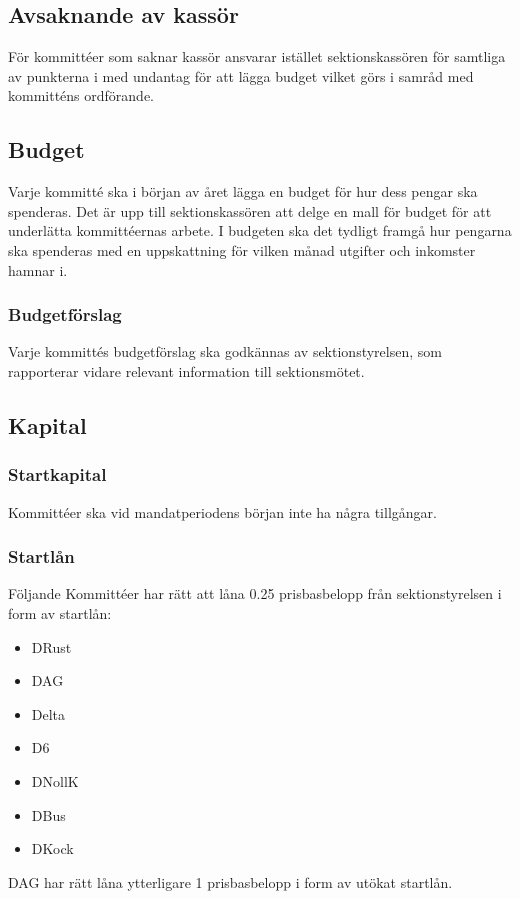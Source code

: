 \documentclass[a4paper]{dtek}
\newcommand{\prisbasbelopp}[1]{
    #1 prisbasbelopp
    \ifdef{\nuvarandeprisbasbelopp}{
        \marginpar{
            \small{ \textbf{\roundandprint{\xintiexpr#1 * \nuvarandeprisbasbelopp\relax}kr}}
        }
    }{}
}
\begin{document}
\subsection{Avsaknande av kassör}
För kommittéer som saknar kassör ansvarar istället sektionskassören för samtliga av punkterna i  med undantag för att lägga budget vilket görs i samråd med kommitténs ordförande.
\subsection{Budget}
\label{sec:budget}
Varje kommitté ska i början av året lägga en budget för hur dess pengar ska spenderas. Det är upp till sektionskassören att delge en mall för budget för att underlätta kommittéernas arbete. I budgeten ska det tydligt framgå hur pengarna ska spenderas med en uppskattning för vilken månad utgifter och inkomster hamnar i.

\subsubsection{Budgetförslag}
Varje kommittés budgetförslag ska godkännas av sektionstyrelsen, som rapporterar vidare relevant information till sektionsmötet.


\subsection{Kapital}
\label{sec:sektionsforeningar_startkapital}
\subsubsection{Startkapital}
Kommittéer ska vid mandatperiodens början inte ha några tillgångar.
\subsubsection{Startlån}
Följande Kommittéer har rätt att låna \prisbasbelopp{0.25} från sektionstyrelsen i form av startlån:
\begin{itemize}
  \item DRust
  \item DAG
  \item Delta
  \item D6
  \item DNollK
  \item DBus
  \item DKock
\end{itemize}
DAG har rätt låna ytterligare \prisbasbelopp{1} i form av utökat startlån.
\end{document}
